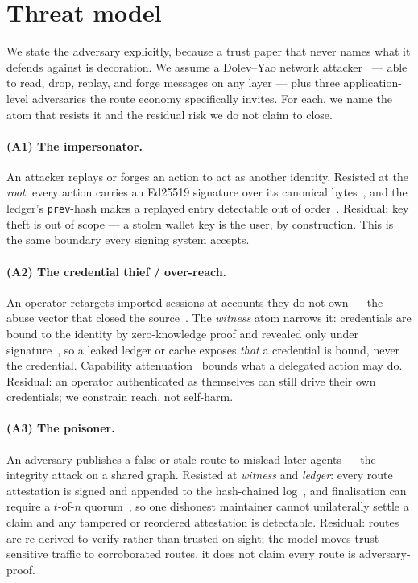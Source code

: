 \documentclass[11pt]{article}
\begin{document}
\section{Threat model}

We state the adversary explicitly, because a trust paper that never names what it
defends against is decoration. We assume a Dolev--Yao network
attacker~\cite{dolevyao} --- able to read, drop, replay, and forge messages on any
layer --- plus three application-level adversaries the route economy specifically
invites. For each, we name the atom that resists it and the residual risk we do not
claim to close.

\paragraph{(A1) The impersonator.} An attacker replays or forges an action to act
as another identity. Resisted at the \emph{root}: every action carries an Ed25519
signature over its canonical bytes~\cite{rfc8032}, and the ledger's
\texttt{prev}-hash makes a replayed entry detectable out of order~\cite{rfc6962}.
Residual: key theft is out of scope --- a stolen wallet key is the user, by
construction. This is the same boundary every signing system accepts.

\paragraph{(A2) The credential thief / over-reach.} An operator retargets imported
sessions at accounts they do not own --- the abuse vector that closed the
source~\cite{ossnotice}. The \emph{witness} atom narrows it: credentials are bound
to the identity by zero-knowledge proof and revealed only under
signature~\cite{zklogin,camlys}, so a leaked ledger or cache exposes \emph{that} a
credential is bound, never the credential. Capability attenuation~\cite{ocap} bounds
what a delegated action may do. Residual: an operator authenticated as themselves
can still drive their own credentials; we constrain reach, not self-harm.

\paragraph{(A3) The poisoner.} An adversary publishes a false or stale route to
mislead later agents --- the integrity attack on a shared graph. Resisted at
\emph{witness} and \emph{ledger}: every route attestation is signed and appended to
the hash-chained log~\cite{rfc6962}, and finalisation can require a $t$-of-$n$
quorum~\cite{frost}, so one dishonest maintainer cannot unilaterally settle a claim
and any tampered or reordered attestation is detectable. Residual: routes are
re-derived to verify rather than trusted on sight; the model moves trust-sensitive
traffic to corroborated routes, it does not claim every route is adversary-proof.
\end{document}

